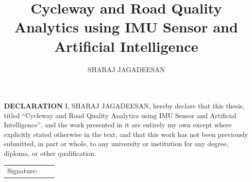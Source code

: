 \documentclass[a4paper,12pt]{Classes/RoboticsLaTeX}
\title{\Large{Cycleway and Road Quality Analytics using IMU Sensor and Artificial Intelligence}}
\author{SHARAJ JAGADEESAN}
\begin{document}
	\begin{spacing}{1}
		\maketitle
	\end{spacing}
	
	\newpage\null\thispagestyle{empty}\newpage
	
	\setcounter{secnumdepth}{3}
	\setcounter{tocdepth}{3}
	
	\frontmatter
	
	\textbf{DECLARATION} 
	I, SHARAJ JAGADEESAN, hereby declare that this thesis, titled ``Cycleway and Road Quality Analytics using IMU Sensor and Artificial Intelligence'', and the work presented in it are entirely my own except where explicitly stated otherwise in the text, and that this work has not been previously submitted, in part or whole, to any university or institution for any degree, diploma, or other qualification. 
	\newline
	
	\begin{tabular}{@{}p{.5in}p{4in}@{}}
		Signature: & ~~\hrulefill \\
	\end{tabular}
	\newpage
	
	
	
\end{document}
